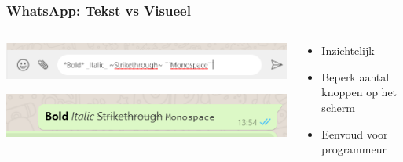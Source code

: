\documentclass[../presentatie.tex]{subfiles}
\begin{document}
    
    \begin{frame}
        \frametitle{WhatsApp: Tekst vs Visueel}
        \begin{columns}
            \begin{column}{0.5\textwidth}
                \includegraphics[width=\linewidth]{assets/whatsappStyles2.png}
                
                \bigskip
                
                \includegraphics[width=\linewidth]{assets/whatsappStylesResult2.png}
            \end{column}
            \begin{column}{0.5\textwidth}
                \begin{itemize}
                    \item Inzichtelijk
                    \item Beperk aantal knoppen op het scherm
                    \item Eenvoud voor programmeur
                \end{itemize}
            \end{column}
        \end{columns}
    \end{frame}
    
\end{document}
